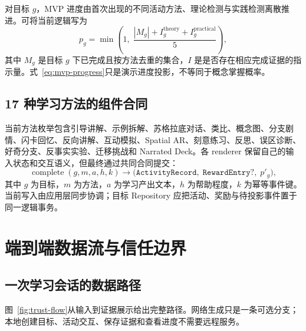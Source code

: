 \documentclass[11pt,a4paper,fontset=none]{ctexart}
\begin{document}
对目标 $g$，MVP 进度由首次出现的不同活动方法、理论检测与实践检测离散推进。可将当前逻辑写为
\begin{equation}
  p_g = \min\!\left(1,\; \frac{|M_g| + I_g^{\mathrm{theory}} + I_g^{\mathrm{practical}}}{5}\right),
  \label{eq:mvp-progress}
\end{equation}
其中 $M_g$ 是目标 $g$ 下已完成且按方法去重的集合，$I$ 是是否存在相应完成证据的指示量。式~\eqref{eq:mvp-progress}只是演示进度投影，不等同于概念掌握概率。

\subsection{17 种学习方法的组件合同}
当前方法枚举包含引导讲解、示例拆解、苏格拉底对话、类比、概念图、分支剧情、闪卡回忆、反向讲解、互动模拟、Spatial AR、刻意练习、反思、误区诊断、好奇分支、反事实实验、迁移挑战和 Narrated Deck。各 renderer 保留自己的输入状态和交互语义，但最终通过共同合同提交：
\begin{equation}
  \operatorname{complete}(g,m,a,h,k)
  \longrightarrow
  \bigl(\texttt{ActivityRecord},\;\texttt{RewardEntry?},\;p'_g\bigr),
\end{equation}
其中 $g$ 为目标，$m$ 为方法，$a$ 为学习产出文本，$h$ 为帮助程度，$k$ 为幂等事件键。当前写入由应用层同步协调；目标 Repository 应把活动、奖励与待投影事件置于同一逻辑事务。

\section{端到端数据流与信任边界}

\subsection{一次学习会话的数据路径}
图~\ref{fig:trust-flow}从输入到证据展示给出完整路径。网络生成只是一条可选分支；本地创建目标、活动交互、保存证据和查看进度不需要远程服务。
\end{document}
